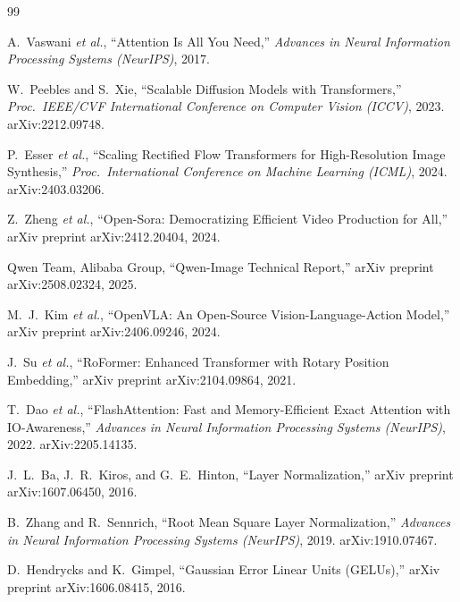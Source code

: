 \documentclass[11pt]{report}
\begin{document}
\begin{thebibliography}{99}

A.~Vaswani \emph{et al.},
``Attention Is All You Need,''
\emph{Advances in Neural Information Processing Systems (NeurIPS)}, 2017.

W.~Peebles and S.~Xie,
``Scalable Diffusion Models with Transformers,''
\emph{Proc.\ IEEE/CVF International Conference on Computer Vision (ICCV)}, 2023.
arXiv:2212.09748.

P.~Esser \emph{et al.},
``Scaling Rectified Flow Transformers for High-Resolution Image Synthesis,''
\emph{Proc.\ International Conference on Machine Learning (ICML)}, 2024.
arXiv:2403.03206.

Z.~Zheng \emph{et al.},
``Open-Sora: Democratizing Efficient Video Production for All,''
arXiv preprint arXiv:2412.20404, 2024.

Qwen Team, Alibaba Group,
``Qwen-Image Technical Report,''
arXiv preprint arXiv:2508.02324, 2025.

M.~J.~Kim \emph{et al.},
``OpenVLA: An Open-Source Vision-Language-Action Model,''
arXiv preprint arXiv:2406.09246, 2024.

J.~Su \emph{et al.},
``RoFormer: Enhanced Transformer with Rotary Position Embedding,''
arXiv preprint arXiv:2104.09864, 2021.

T.~Dao \emph{et al.},
``FlashAttention: Fast and Memory-Efficient Exact Attention with IO-Awareness,''
\emph{Advances in Neural Information Processing Systems (NeurIPS)}, 2022.
arXiv:2205.14135.

J.~L.~Ba, J.~R.~Kiros, and G.~E.~Hinton,
``Layer Normalization,''
arXiv preprint arXiv:1607.06450, 2016.

B.~Zhang and R.~Sennrich,
``Root Mean Square Layer Normalization,''
\emph{Advances in Neural Information Processing Systems (NeurIPS)}, 2019.
arXiv:1910.07467.

D.~Hendrycks and K.~Gimpel,
``Gaussian Error Linear Units (GELUs),''
arXiv preprint arXiv:1606.08415, 2016.


\end{thebibliography}
\end{document}
